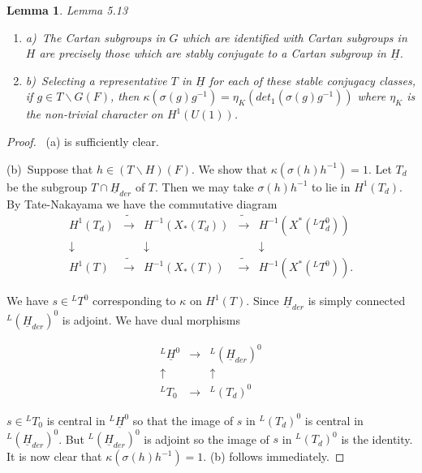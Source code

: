\documentclass{memo-l}
\newtheorem{lemma}[theorem]{Lemma}
\theoremstyle{definition}
\theoremstyle{remark}
\numberwithin{section}{chapter}
\numberwithin{equation}{chapter}
\begin{document}
\medskip


\begin{lemma}{Lemma 5.13}
\begin{enumerate}
\item{a)}\  The Cartan subgroups in $G$ which are identified with 
Cartan subgroups
in $H$ are precisely those which are stably conjugate to a Cartan subgroup
in $\underline{H}$.
\item{b)}\  Selecting a representative $T$ in $\underline{H}$ for each of these stable
conjugacy classes, if $g  \in  T\backslash G(F)$, then
${\kappa}({\sigma}(g)g^{-1})  =  {\eta}_{K}(det_{1}({\sigma}(g)g^{-1}))$
where ${\eta}_{K}$ is the non-trivial character on $H^{1}(U(1))$.
\end{enumerate}
\end{lemma}


\begin{proof} \ (a) is sufficiently clear.

(b)\ Suppose that $h  \in  (T\backslash H)(F)$.  We show that
${\kappa}({\sigma}(h)h^{-1})  = 1$.  Let $T_{d}$ be the subgroup $T {\cap}
\underline{H}_{der}$ of $T$.  Then we may take ${\sigma}(h)h^{-1}$ to lie in
$H^{1}(T_{d})$.  By Tate-Nakayama we have the commutative diagram
$$
\begin{matrix} 
H^{1}(T_{d}) & \tilde{\to} & H^{-1}(X_{*}(T_{d})) & \tilde{\to}	&
H^{-1}(X^{*}(^{L}T_{d}^{0})) \\
\downarrow && \downarrow && \downarrow \\
H^{1}(T) & \tilde{\to} & H^{-1}(X_{*}(T)) & \tilde{\to}	&
H^{-1}(X^{*}(^{L}T^{0}))   .
\end{matrix}
$$

\noindent
We have $s  \in {}^{L}T^{0}$ corresponding to ${\kappa}$ on $H^{1}(T)$.
Since $\underline{H}_{der}$ is simply connected ${}^{L}(\underline{H}_{der})^{0}$ is
adjoint.  We have dual morphisms

$$
\begin{matrix} 
         ^{L}\underline{H}^{0} & \to & {}^{L}(\underline{H}_{der})^{0}\\
	 \uparrow && \uparrow \\
         ^{L}T_{0} &\to & {}^{L}(T_{d})^{0}
	 \end{matrix}
$$


$s  \in  {}^{L}T_{0}$ is central in $^{L}\underline{H}^{0}$ so that the image of
$s$ in $^{L}(T_{d})^{0}$ is central in $^{L}(\underline{H}_{der})^{0}$.  But
$^{L}(\underline{H}_{der})^{0}$ is adjoint so the image of $s$ in
${}^{L}(T_{d})^{0}$ is the identity.  It is now clear that
${\kappa}({\sigma}(h)h^{-1})  =  1$.  (b) follows immediately.
\end{proof}
{\medskip}
\end{document}
